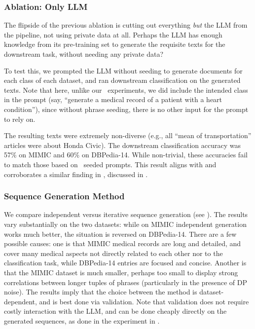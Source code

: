 \subsubsection{Ablation: Only LLM}
The flipside of the previous ablation is cutting out everything \emph{but} the LLM from the pipeline, not using private data at all. Perhaps the LLM has enough knowledge from its pre-training set to generate the requisite texts for the downstream task, without needing any private data?

To test this, we prompted the LLM without seeding to generate documents for each class of each dataset, and ran downstream classification on the generated texts. Note that here, unlike our \alg\ experiments, we did include the intended class in the prompt (say, ``generate a medical record of a patient with a heart condition''), since without phrase seeding, there is no other input for the prompt to rely on. 

The resulting texts were extremely non-diverse (e.g., all ``mean of transportation'' articles were about Honda Civic). 
The downstream classification accuracy was 57\% on MIMIC and 60\% on DBPedia-14. While non-trivial, these accuracies fail to match those based on \alg\ seeded prompts. 
This result aligns with and corroborates a similar finding in \cite{eldan2023tinystories}, discussed in .
%

\subsubsection{Sequence Generation Method}

We compare independent versus iterative sequence generation (see ). The results vary substantially on the two datasets: while on MIMIC independent generation works much better, the situation is reversed on DBPedia-14. There are a few possible causes: one is that MIMIC medical records are long and detailed, and cover many medical aspects not directly related to each other nor to the classification task, while DBPedia-14 entries are focused and concise. Another is that the MIMIC dataset is much smaller, perhaps too small to display strong correlations between longer tuples of phrases (particularly in the presence of DP noise). The results imply that the choice between the method is dataset-dependent, and is best done via validation. Note that validation does not require costly interaction with the LLM, and can be done cheaply directly on the generated sequences, as done in the experiment in .

